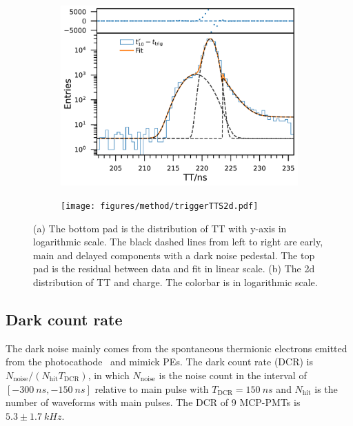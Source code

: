 \begin{figure}[!htbp]
    \centering
    \begin{subfigure}[t]{\SF\textwidth}
        \includegraphics[width=\textwidth]{figures/method/triggerTTSLog.pdf}
        \caption{}%
        \label{fig:triggerTTSLog}
    \end{subfigure}
    \begin{subfigure}[t]{\SF\textwidth}
        \texttt{[image: figures/method/triggerTTS2d.pdf]}
        \caption{}%
        \label{fig:triggerTTS2d}
    \end{subfigure}
    \caption{(a) The bottom pad is the distribution of TT with y-axis in logarithmic scale. The black dashed lines from left to right are early, main and delayed components with a dark noise pedestal. The top pad is the residual between data and fit in linear scale. (b) The 2d distribution of TT and charge. The colorbar is in logarithmic scale.}
\end{figure}

\subsection{Dark count rate}
\label{sec:dcr}
The dark noise mainly comes from the spontaneous thermionic electrons emitted from the photocathode~\cite{KM3NetTesting} and mimick PEs. The dark count rate (DCR) is ${N_{\mathrm{noise}}}/({N_{\mathrm{hit}}T_{\mathrm{DCR}}})$, in which $N_{\mathrm{noise}}$ is the noise count in the interval of $[\SI{-300}{ns},\SI{-150}{ns}]$ relative to main pulse with $T_{\mathrm{DCR}}=\SI{150}{ns}$ and $N_{\mathrm{hit}}$ is the number of waveforms with main pulses. The DCR of 9 MCP-PMTs is $5.3\pm\SI{1.7}{kHz}$.

